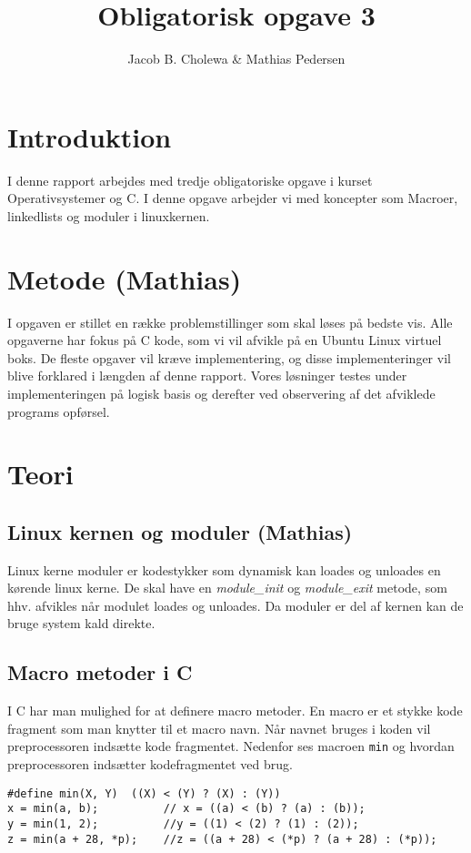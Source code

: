\documentclass[danish]{report}
\title{Obligatorisk opgave 3}
\author{Jacob B. Cholewa \& Mathias Pedersen }
\begin{document}
\maketitle

\chapter{Introduktion}
I denne rapport arbejdes med tredje obligatoriske opgave i kurset Operativsystemer og C. I denne opgave arbejder vi med koncepter som Macroer, linkedlists og moduler i linuxkernen.

\chapter{Metode (Mathias)}
I opgaven er stillet en række problemstillinger som skal løses på bedste vis. Alle opgaverne har fokus på C kode, som vi vil afvikle på en Ubuntu Linux virtuel boks. De fleste opgaver vil kræve implementering, og disse implementeringer vil blive forklared i længden af denne rapport. Vores løsninger testes under implementeringen på logisk basis og derefter ved observering af det afviklede programs opførsel.

\chapter{Teori}
\section{Linux kernen og moduler (Mathias)}

Linux kerne moduler er kodestykker som dynamisk kan loades og unloades en kørende linux kerne. De skal have en \textit{module\_init} og \textit{module\_exit} metode, som hhv. afvikles når modulet loades og unloades. Da moduler er del af kernen kan de bruge system kald direkte.

\section{Macro metoder i C}

I C har man mulighed for at definere macro metoder. En macro er et stykke kode fragment som man knytter til et macro navn. Når navnet bruges i koden vil preprocessoren indsætte kode fragmentet. Nedenfor ses macroen \texttt{min} og hvordan preprocessoren indsætter kodefragmentet ved brug.
\begin{lstlisting}
#define min(X, Y)  ((X) < (Y) ? (X) : (Y))
x = min(a, b);          // x = ((a) < (b) ? (a) : (b));
y = min(1, 2);          //y = ((1) < (2) ? (1) : (2));
z = min(a + 28, *p);    //z = ((a + 28) < (*p) ? (a + 28) : (*p));
\end{lstlisting}
\end{document}
